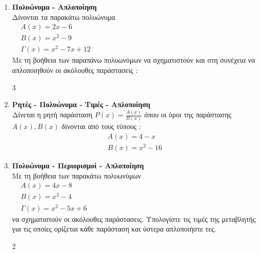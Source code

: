 \documentclass[11pt,a4paper,modern]{FFExercises}
\begin{document}
\begin{enumerate}[resume]
\item \textbf{Πολυώνυμα - Απλοποίηση}\\
Δίνονται τα παρακάτω πολυώνυμα\\
$ \begin{aligned}
& A(x)=2x-6\\& B(x)=x^2-9\\& \varGamma(x)=x^2-7x+12
\end{aligned} $\\
Με τη βοήθεια των παραπάνω πολυωνύμων να σχηματιστούν και στη συνέχεια να απλοποιηθούν οι ακόλουθες παράστασεις :
\begin{multicols}{3}
\end{multicols}

\item \textbf{Ρητές - Πολυώνυμα - Τιμές - Απλοποίηση}\\
Δίνεται η ρητή παράσταση $ P(x)=\frac{A(x)}{B(x)} $ όπου οι όροι της παράστασης $ A(x), B(x) $ δίνονται από τους τύπους : \begin{gather*}
 A(x)=4-x\\ B(x)=x^2-16
\end{gather*}

\item \textbf{Πολυώνυμα - Περιορισμοί - Απλοποίηση}\\
Με τη βοήθεια των παρακάτω πολυωνύμων\\
$ \begin{aligned}
& A(x)=4x-8\\& B(x)=x^2-4\\& \varGamma(x)=x^2-5x+6
\end{aligned} $\\
να σχηματιστούν οι ακόλουθες παράστασεις. Υπολογίστε τις τιμές της μεταβλητής για τις οποίες ορίζεται κάθε παράσταση και ύστερα απλοποιήστε τες.
\begin{multicols}{2}
\end{multicols}

\end{enumerate}
\end{document}
